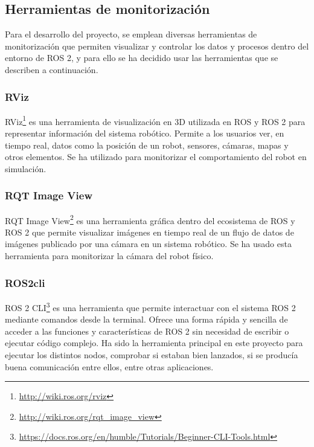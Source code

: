 \subsection{Herramientas de monitorización}
\label{subsec:monitorización}

Para el desarrollo del proyecto, se emplean diversas herramientas de monitorización que permiten visualizar y controlar los datos y procesos dentro del entorno de ROS 2, y para ello se ha decidido usar las herramientas que se describen a continuación.

\subsubsection{RViz}
\label{subsubsec:rviz}

RViz\footnote{\url{http://wiki.ros.org/rviz}} es una herramienta de visualización en 3D utilizada en ROS y ROS 2 para representar información del sistema robótico. Permite a los usuarios ver, en tiempo real, datos como la posición de un robot, sensores, cámaras, mapas y otros elementos. Se ha utilizado para monitorizar el comportamiento del robot en simulación.



\subsubsection{RQT Image View}
\label{subsubsec:rqtimage}

RQT Image View\footnote{\url{http://wiki.ros.org/rqt_image_view}} es una herramienta gráfica dentro del ecosistema de ROS y ROS 2 que permite visualizar imágenes en tiempo real de un flujo de datos de imágenes publicado por una cámara en un sistema robótico. Se ha usado esta herramienta para monitorizar la cámara del robot físico.

\subsubsection{ROS2cli}
\label{subsubsec:ros2cli}

ROS 2 \ac{CLI}\footnote{\url{https://docs.ros.org/en/humble/Tutorials/Beginner-CLI-Tools.html}} es una herramienta que permite interactuar con el sistema ROS 2 mediante comandos desde la terminal. Ofrece una forma rápida y sencilla de acceder a las funciones y características de ROS 2 sin necesidad de escribir o ejecutar código complejo. Ha sido la herramienta principal en este proyecto para ejecutar los distintos nodos, comprobar si estaban bien lanzados, si se producía buena comunicación entre ellos, entre otras aplicaciones.


